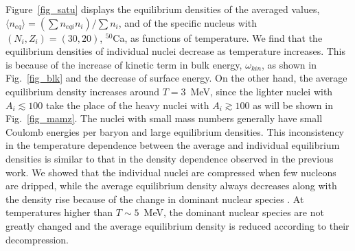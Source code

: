 \documentclass[preprint]{revtex4}
\begin{document}
Figure~\ref{fig_satu} displays the equilibrium densities of the averaged values, 
 $\langle n_{eq}\rangle=(\sum n_{eqi} n_i)/\sum n_i$, and of the specific nucleus with $(N_i,Z_i)=(30,20)$, $^{50}$Ca, as functions of temperature. 
We find that the equilibrium densities of individual nuclei decrease as temperature increases.
This is because of  the increase of kinetic term in bulk energy, $\omega_{kin}$, as shown in Fig.~\ref{fig_blk} and the decrease of  surface energy.
On the other hand, the average equilibrium density increases around $T=3$~MeV, since the lighter nuclei with $A_i \lesssim100$ take the
 place of the heavy nuclei with $A_i \gtrsim100$ as will  be shown in Fig.~\ref{fig_mamz}.
 The  nuclei with small mass numbers generally have small Coulomb energies per baryon and large  equilibrium densities. 
This inconsistency in the temperature dependence between the average and individual equilibrium densities is similar to that in the density dependence observed in the previous work.
We showed that the individual nuclei are compressed  when few nucleons are dripped, while the average equilibrium density always decreases along with the density rise
because of the change in dominant nuclear species
  \cite{furusawa17c}.
At  temperatures higher than $T\sim5$~MeV, the dominant nuclear species are not greatly changed  
and  the average equilibrium density is reduced according to their decompression.
\end{document}
